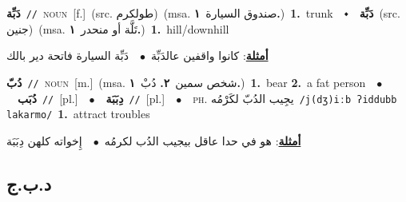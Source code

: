 \documentclass[10pt,a4paper,twoside]{article} %
\begin{document}
\begin{multicols}{2}
{\setlength\topsep{0pt}\textbf{\foreignlanguage{arabic}{دَبِّة}}\ {\color{gray}\texttt{//}\color{black}}\ \textsc{noun}\ [f.]\ (src. \color{gray}\foreignlanguage{arabic}{طولكرم}\color{black})\ \color{gray}(msa. \foreignlanguage{arabic}{صندوق السيارة}~\foreignlanguage{arabic}{\textbf{١.}})\color{black}\ \textbf{1.}~trunk\ \ $\smblkdiamond$\ \ \setlength\topsep{0pt}\textbf{\foreignlanguage{arabic}{دَبِّة}}\ (src. \color{gray}\foreignlanguage{arabic}{جنين}\color{black})\ \color{gray}(msa. \foreignlanguage{arabic}{تَلَّة أو منحدر}~\foreignlanguage{arabic}{\textbf{١.}})\color{black}\ \textbf{1.}~hill/downhill\  \begin{flushright}\color{gray}\foreignlanguage{arabic}{\textbf{\underline{\foreignlanguage{arabic}{أمثلة}}}: كانوا واقفين عالدَبِّة\ $\bullet$\ \  دَبِّة السيارة فاتحة دير بالك}\end{flushright}\color{black}} \vspace{2mm}

{\setlength\topsep{0pt}\textbf{\foreignlanguage{arabic}{دُبّ}}\ {\color{gray}\texttt{//}\color{black}}\ \textsc{noun}\ [m.]\ \color{gray}(msa. \foreignlanguage{arabic}{شخص سمين}~\foreignlanguage{arabic}{\textbf{٢.}}  \foreignlanguage{arabic}{دُبْ}~\foreignlanguage{arabic}{\textbf{١.}})\color{black}\ \textbf{1.}~bear  \textbf{2.}~a fat person\ \ $\bullet$\ \ \setlength\topsep{0pt}\textbf{\foreignlanguage{arabic}{دُبَب}}\ {\color{gray}\texttt{//}\color{black}}\ [pl.]\ \ $\bullet$\ \ \setlength\topsep{0pt}\textbf{\foreignlanguage{arabic}{دِبَبَة}}\ {\color{gray}\texttt{//}\color{black}}\ [pl.]\ \ $\bullet$\ \ \textsc{ph.} \color{gray} \foreignlanguage{arabic}{يجِيب الدُبّ لكَرْمُه}\color{black}\ {\color{gray}\texttt{/{\sffamily j(dʒ)iːb ʔiddubb lakarmo}/}\color{black}}\ \textbf{1.}~attract troubles\  \begin{flushright}\color{gray}\foreignlanguage{arabic}{\textbf{\underline{\foreignlanguage{arabic}{أمثلة}}}: هو في حدا عاقل بيجيب الدُب لكرمُه\ $\bullet$\ \  إِخواته كلهن دِبَبَة}\end{flushright}\color{black}} \vspace{2mm}

\vspace{-3mm}
\subsection*{\color{blue}\foreignlanguage{arabic}{د.ب.ج}\color{blue}{ (ntws)}} 


\end{multicols}
\end{document}
